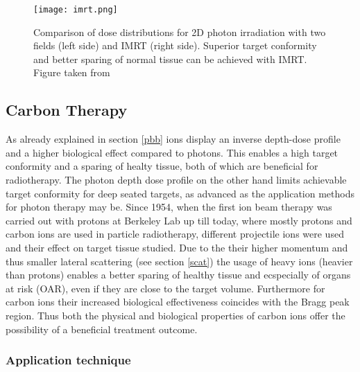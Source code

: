 \documentclass[type=dr, dr=rernat, accentcolor=tud7b,colorbacktitle, bigchapter, openright, twoside, 12pt ]{tudthesis}
\begin{document}
\begin{figure}[H]
\begin{center}
\texttt{[image: imrt.png]}
\caption{Comparison of dose distributions for 2D photon irradiation with two fields (left side) and IMRT (right side). Superior target 
conformity and better sparing of normal tissue can be achieved with IMRT. Figure taken from \cite{Buc05}}
\label{imrt}
\end{center}
\end{figure}


\subsection{Carbon Therapy}

As already explained in section \ref{pbb} ions display an inverse depth-dose profile and a higher biological effect compared to photons. 
This enables a high target conformity and a sparing of healty tissue, both of which are beneficial for radiotherapy. 
The photon depth dose profile on the other hand limits achievable target conformity for deep seated targets, as advanced as the application 
methods for photon therapy may be. Since 1954, when the first ion beam therapy was carried out with protons at Berkeley Lab 
\cite{Tob58} up till today, where mostly protons and carbon ions are used in particle radiotherapy, different projectile ions were used and 
their effect on target tissue studied.\newline
\newline
Due to the their higher momentum and thus smaller lateral scattering (see section \ref{scat}) the usage of heavy ions (heavier than protons) 
enables a better sparing of healthy tissue and ecspecially of organs at risk (OAR), even if they are close to the target volume. 
Furthermore for carbon ions their increased biological effectiveness coincides with the Bragg peak region. Thus both the physical and 
biological properties of carbon ions offer the possibility of a beneficial treatment outcome. 

\subsubsection*{Application technique}
\end{document}
